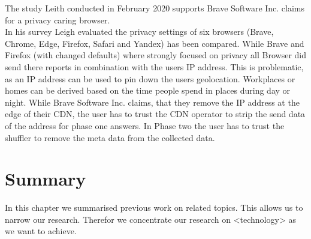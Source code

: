     
    
    The study Leith conducted in February 2020 \cite{leith_web_2020} supports Brave Software Inc. claims
    for a privacy caring browser.\\
    In his survey Leigh evaluated the privacy settings of six browsers (Brave, Chrome, Edge, Firefox, Safari and Yandex) has been compared. While Brave and Firefox (with changed defaults) where strongly focused on privacy all Browser did send there reports in combination with the users IP address\cite{leith_web_2020}.
    This is problematic, as an IP address can be used to pin down the users geolocation\cite{koch_geolocation_2013}. Workplaces or homes can be derived based on the time people spend in places during day or night. 
    While Brave Software Inc. claims, that they remove the IP address at the edge of their CDN, the user has to trust the CDN operator to strip the send data of the address for phase one answers. In Phase two the user has to trust the shuffler to remove the meta data from the collected data. 

\section{Summary}
In this chapter we summarised previous work on related topics. This allows us to narrow our research.
Therefor we concentrate our research on <technology> as we want to achieve.
%


  